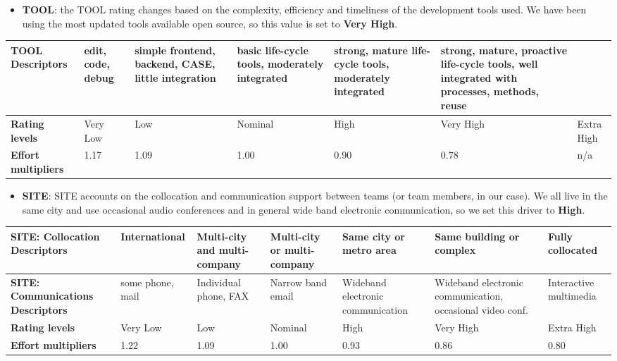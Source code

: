 		\begin{itemize}
			\item \textbf{TOOL}: the TOOL rating changes based on the complexity, efficiency and timeliness of the development tools used. We have been using the most updated tools available open source, so this value is set to \textbf{Very High}.
		\end{itemize}
		
		\begin{center}
			\begin{tabular}{ | C{2cm} | C{2cm} | C{2cm} | C{2cm} | C{2cm} | C{2cm} | C{2cm} | }
				\hline
				\textbf{TOOL Descriptors} & edit, code, debug & simple frontend, backend, CASE, little integration & basic life-cycle tools, moderately integrated & strong, mature life-cycle tools, moderately integrated & strong, mature, proactive life-cycle tools, well integrated with processes, methods, reuse & \\ \hline
			
				\textbf{Rating levels} & Very Low & Low & Nominal & High & Very High & Extra High\\ \hline
			
				\textbf{Effort multipliers} & 1.17 & 1.09 & 1.00 & 0.90 & 0.78 & n/a\\ \hline
			\end{tabular}
		\end{center}
		
		
		
		\begin{itemize}
			\item \textbf{SITE}: SITE accounts on the collocation and communication support between teams (or team members, in our case). We all live in the same city and use occasional audio conferences and in general wide band electronic communication, so we set this driver to \textbf{High}.
		\end{itemize}
		
		\begin{center}
			\begin{tabular}{ | C{2cm} | C{2cm} | C{2cm} | C{2cm} | C{2cm} | C{2cm} | C{2cm} | }
				\hline
				\textbf{SITE: Collocation Descriptors} & International & Multi-city and multi-company & Multi-city or multi-company & Same city or metro area & Same building or complex & Fully collocated \\ \hline
				
				\textbf{SITE: Communications Descriptors} & some phone, mail & Individual phone, FAX & Narrow band email & Wideband electronic communication & Wideband electronic communication, occasional video conf. & Interactive multimedia\\ \hline
			
				\textbf{Rating levels} & Very Low & Low & Nominal & High & Very High & Extra High\\ \hline
			
				\textbf{Effort multipliers} & 1.22 & 1.09 & 1.00 & 0.93 & 0.86 & 0.80\\ \hline
			\end{tabular}
		\end{center}
		
